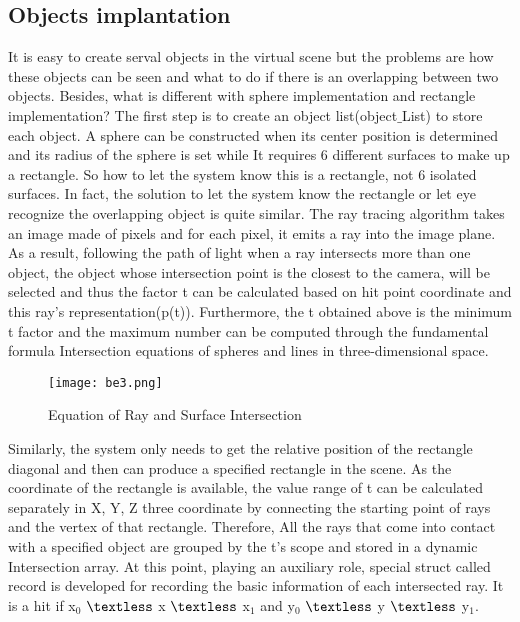 \documentclass[11pt]{article}
\begin{document}
\subsection{Objects implantation}
It is easy to create serval objects in the virtual scene but the problems are how these objects can be seen and what to do if there is an overlapping between two objects. Besides, what is different with sphere implementation and rectangle implementation? The first step is to create an object list(object$\_$List) to store each object. A sphere can be constructed when its center position is determined and its radius of the sphere is set while It requires 6 different surfaces to make up a rectangle. So how to let the system know this is a rectangle, not 6 isolated surfaces. In fact, the solution to let the system know the rectangle or let eye recognize the overlapping object is quite similar. The ray tracing algorithm takes an image made of pixels and for each pixel, it emits a ray into the image plane. As a result, following the path of light when a ray intersects more than one object, the object whose intersection point is the closest to the camera, will be selected and thus the factor t can be calculated based on hit point coordinate and this ray’s representation(p(t)). Furthermore, the t obtained above is the minimum t factor and the maximum number can be computed through the fundamental formula Intersection equations of spheres and lines in three-dimensional space.

\begin{figure}[H]

\centering
\texttt{[image: be3.png]}
\caption{Equation of Ray and Surface Intersection}
\label{fig:label}
\end{figure}

Similarly, the system only needs to get the relative position of the rectangle diagonal and then can produce a specified rectangle in the scene. As the coordinate of the rectangle is available, the value range of t can be calculated separately in X, Y, Z three coordinate by connecting the starting point of rays and the vertex of that rectangle. Therefore, All the rays that come into contact with a specified object are grouped by the t’s scope and stored in a dynamic Intersection array. At this point, playing an auxiliary role, special struct called record is developed for recording the basic information of each intersected ray. It is a hit if x$_{0}$ $\textless$ x $\textless$ x$_{1}$ and y$_{0}$ $\textless$ y $\textless$ y$_{1}$.
\end{document}
